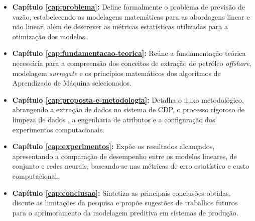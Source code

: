 \begin{itemize}
    \item \textbf{Capítulo \ref{cap:problema}:} Define formalmente o problema de previsão de vazão, estabelecendo as modelagens matemáticas para as abordagens linear e não linear, além de descrever as métricas estatísticas utilizadas para a otimização dos modelos.
    \item \textbf{Capítulo \ref{cap:fundamentacao-teorica}:} Reúne a fundamentação teórica necessária para a compreensão dos conceitos de extração de petróleo \textit{offshore}, modelagem \textit{surrogate} e os princípios matemáticos dos algoritmos de Aprendizado de Máquina selecionados.
    \item \textbf{Capítulo \ref{cap:proposta-e-metodologia}:} Detalha o fluxo metodológico, abrangendo a extração de dados no sistema de \gls{CDP}, o processo rigoroso de limpeza de dados , a engenharia de atributos e a configuração dos experimentos computacionais.
    \item \textbf{Capítulo \ref{cap:experimentos}:} Expõe os resultados alcançados, apresentando a comparação de desempenho entre os modelos lineares, de conjunto e redes neurais, baseando-se nas métricas de erro estatístico e custo computacional.
    \item \textbf{Capítulo \ref{cap:conclusao}:} Sintetiza as principais conclusões obtidas, discute as limitações da pesquisa e propõe sugestões de trabalhos futuros para o aprimoramento da modelagem preditiva em sistemas de produção.
\end{itemize}